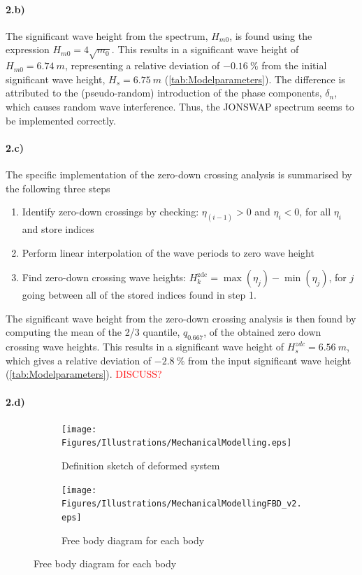 \paragraph{2.b)} The significant wave height from the spectrum, $H_{m0}$, is found using the expression $H_{m0} = 4\sqrt{m_0}$. This results in a significant wave height of $H_{m0}=\SI{6.74}{m}$, representing a relative deviation of $\SI{-0.16}{\percent}$ from the initial significant wave height, $H_s=\SI{6.75}{m}$ (\cref{tab:Modelparameters}). The difference is attributed to the (pseudo-random) introduction of the phase components, $\delta_n$, which causes random wave interference. Thus, the JONSWAP spectrum seems to be implemented correctly. 

\paragraph{2.c)} The specific implementation of the zero-down crossing analysis is summarised by the following three steps
\begin{enumerate}
    \item Identify zero-down crossings by checking: $\eta_{(i-1)}> 0$ and $\eta_{i} < 0$, for all $\eta_i$ and store indices
    \item Perform linear interpolation of the wave periods to zero wave height
    \item Find zero-down crossing wave heights: $H_k^{\text{zdc}}=\max(\eta_{j})-\min(\eta_{j})$, for $j$ going between all of the stored indices found in step 1.
\end{enumerate}
The significant wave height from the zero-down crossing analysis is then found by computing the mean of the 2/3 quantile, $q_{0.667}$, of the obtained zero down crossing wave heights. This results in a significant wave height of $H_s^{zdc}=\SI{6.56}{m}$, which gives a relative deviation of $\SI{-2.8}{\percent}$ from the input significant wave height (\cref{tab:Modelparameters}). \textcolor{red}{DISCUSS?}

\paragraph{2.d)}

\begin{figure}[htb]
\begin{subfigure}[t]{.5\textwidth}
    \centering
    \texttt{[image: Figures/Illustrations/MechanicalModelling.eps]}
    \caption{Definition sketch of deformed system}
    \label{fig:MechanicalModel}
\end{subfigure}%
\begin{subfigure}[t]{.5\textwidth}
    \centering
    \texttt{[image: Figures/Illustrations/MechanicalModellingFBD\_v2.eps]}
    \caption{Free body diagram for each body}
    \label{fig:MechanicalModelFBD}
\end{subfigure}
\end{figure}
